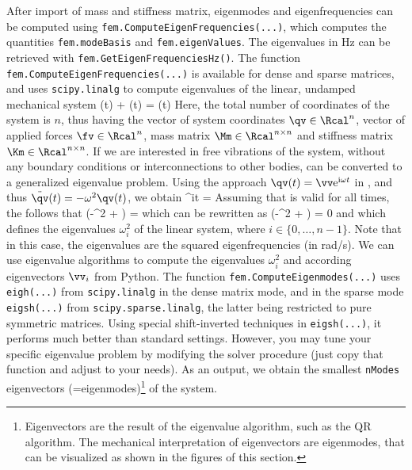 After import of mass and stiffness matrix, eigenmodes and eigenfrequencies can be computed using \texttt{fem.ComputeEigenFrequencies(...)}, 
which computes the quantities \texttt{fem.modeBasis} and \texttt{fem.eigenValues}.
The eigenvalues in Hz can be retrieved with \texttt{fem.GetEigenFrequenciesHz()}.
The function \texttt{fem.ComputeEigenFrequencies(...)} is available for dense and sparse matrices, and uses \texttt{scipy.linalg} to compute eigenvalues of the linear, undamped mechanical system
\be \label{theory:eigenmodes:EOM}
  \Mm \ddot \qv(t) + \Km \qv(t) = \fv(t) \eqDot
\ee
Here, the total number of coordinates of the system is $n$, 
thus having the vector of system coordinates $\qv \in \Rcal^n$, 
vector of applied forces $\fv \in \Rcal^n$, 
mass matrix $\Mm \in \Rcal^{n \times n}$ and stiffness matrix $\Km \in \Rcal^{n \times n}$. 
If we are interested in free vibrations of the system, without any boundary conditions or interconnections to other bodies,  can be converted to a generalized eigenvalue problem. Using the approach 
$\qv(t) = \vv \mathrm{e}^{\mathrm{i} \omega t}$ in , and thus $\ddot \qv(t) = -\omega^2 \qv(t)$, we obtain
\be \label{theory:eigenmodes:harmonicEquation}
    \left[ \left(-\omega^2 \Mm + \Km \right) \vv \right] ^{i\omega t} = \Null \eqDot
\ee
Assuming that  is valid for all times, the  follows that
\be \label{theory:eigenmodes:GEP}
  \left(-\omega^2 \Mm + \Km \right) \vv = \Null \eqComma
\ee
which can be rewritten as
\be \label{theory:eigenmodes:GEP2}
  \det \left(-\omega^2 \Mm + \Km \right) = 0 \eqComma
\ee
and which defines the eigenvalues $\omega_i^2$ of the linear system, where $i \in \{0, \ldots, n-1\}$. Note that in this case, the eigenvalues are the squared eigenfrequencies (in rad/s).
We can use eigenvalue algorithms to compute the eigenvalues $\omega_i^2$ and according eigenvectors $\vv_i$ from Python.
The function \texttt{fem.ComputeEigenmodes(...)} uses \texttt{eigh(...)} from \texttt{scipy.linalg} in the dense matrix mode, 
and in the sparse mode \texttt{eigsh(...)} from \texttt{scipy.sparse.linalg}, the latter being restricted to pure symmetric matrices.
Using special shift-inverted techniques in \texttt{eigsh(...)}, it performs much better than standard settings. However, you may tune your specific eigenvalue problem by modifying the solver procedure (just copy that function and adjust to your needs).
As an output, we obtain the smallest \texttt{nModes} eigenvectors (=eigenmodes)\footnote{Eigenvectors are the result of the eigenvalue algorithm, such as the QR algorithm. The mechanical interpretation of eigenvectors are eigenmodes, that can be visualized as shown in the figures of this section.} of the system.

